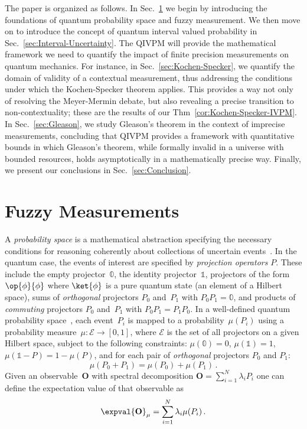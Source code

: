 \documentclass[english,reprint, aps, prl,superscriptaddress, showpacs,
showkeys, longbibliography, amsmath, amssymb]{revtex4-1}
\theoremstyle{plain}
\theoremstyle{definition}
\newcommand{\events}{\ensuremath{\mathcal{E}}}
\newcommand{\proj}[1]{\op{#1}{#1}}
\begin{document}
The paper is organized as follows.  In Sec.\ \ref{sec:fuzzy} we begin
by introducing the foundations of quantum probability space and fuzzy
measurement.  We then move on to introduce the concept of quantum
interval valued probability in Sec.\ \ref{sec:Interval-Uncertainty}.
The QIVPM will provide the mathematical framework we need to quantify the
impact of finite precision measurements on quantum mechanics.  For
instance, in Sec.\ \ref{sec:Kochen-Specker}, we quantify the domain of
validity of a contextual measurement, thus addressing the conditions
under which the Kochen-Specker theorem applies.  This provides a way
not only of resolving the Meyer-Mermin debate, but also revealing a
precise transition to non-contextuality;  these are the results of our
Thm~\ref{cor:Kochen-Specker-IVPM}.  In Sec.\ \ref{sec:Gleason}, we
study Gleason's theorem in the context of imprecise measurements,
concluding that QIVPM provides a framework with quantitative bounds in
which Gleason's theorem, while formally invalid in a universe with
bounded resources, holds asymptotically in a mathematically precise
way.  Finally, we present our conclusions in Sec.~\ref{sec:Conclusion}.

\section{Fuzzy Measurements}
\label{sec:fuzzy}

A \emph{probability space} is a mathematical abstraction specifying
the necessary conditions for reasoning coherently about collections of
uncertain
events~\cite{Kolmogorov1950,544199,Griffiths2003,Grabisch2016}. In the
quantum case, the events of interest are specified by \emph{projection
  operators} $P$. These include the empty projector~$\mathbb{0}$,
the identity projector~$\mathbb{1}$, projectors of the form
$\proj{\phi}$ where $\ket{\phi}$ is a pure quantum state (an element
of a Hilbert space), sums of \emph{orthogonal} projectors $P_0$
and~$P_1$ with $P_0P_1=\mathbb{0}$, and products of \emph{commuting}
projectors $P_0$ and~$P_1$ with $P_0P_1=P_1P_0$. In a well-defined
quantum probability
space~\cite{10.2307/2308516,gleason1957,Redhead1987-REDINA,Maassen2010},
each event~$P_{i}$ is mapped to a probability~$\mu(P_{i})$ using a
probability measure~$\mu:\events\rightarrow[0,1]$, where $\events$
is the set of all projectors on a given Hilbert space, subject to the
following constraints: $\mu(\mathbb{0})=0$, $\mu(\mathbb{1})=1$,
$\mu\left(\mathbb{1}-P\right)=1-\mu\left(P\right)$, and for each pair
of \emph{orthogonal} projectors $P_{0}$ and $P_{1}$:
\begin{equation}
{\mu}\left(P_{0}+P_{1}\right)={\mu}\left(P_{0}\right)+{\mu}\left(P_{1}\right)\,.\label{eq:QuantumProbability-Addition}
\end{equation}
Given an observable~$\mathbf{O}$ with spectral decomposition
$\mathbf{O}=\sum_{i=1}^{N}\lambda_{i}P_{i}$ one can define the 
expectation value of that observable as
\begin{equation}
\expval{\mathbf{O}}_{\mu}=\sum_{i=1}^{N}\lambda_{i}\mu(P_{i})\,.\label{eq:quantum-expectation}
\end{equation}
\end{document}
